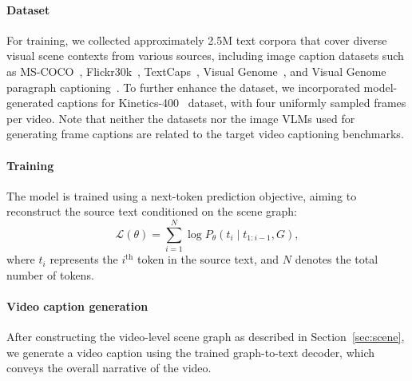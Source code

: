 \paragraph{Dataset}
For training, we collected approximately 2.5M text corpora that cover diverse visual scene contexts from various sources, including image caption datasets such as  MS-COCO~\cite{chen2015microsoft}, Flickr30k~\cite{young2014image}, TextCaps~\cite{sidorov2020textcaps}, Visual Genome~\cite{krishna2017visual}, and Visual Genome paragraph captioning~\cite{krause2016paragraphs}.
To further enhance the dataset, we incorporated model-generated captions for Kinetics-400~\cite{kay2017kinetics} dataset, with four uniformly sampled frames per video.
Note that neither the datasets nor the image VLMs used for generating frame captions are related to the target video captioning benchmarks.


\vspace{-2mm}
\paragraph{Training}
The model is trained using a next-token prediction objective, aiming to reconstruct the source text conditioned on the scene graph:
%
\begin{equation}
\mathcal{L}(\theta) = \sum_{i=1}^{N} \log P_{\theta}(t_i \mid t_{1:i-1}, G),
\end{equation}  
%
where $t_i$ represents the $i^\text{th}$ token in the source text, and $N$ denotes the total number of tokens.


\vspace{-2mm}
\paragraph{Video caption generation}
After constructing the video-level scene graph as described in Section~\ref{sec:scene}, we generate a video caption using the trained graph-to-text decoder, which conveys the overall narrative of the video.
